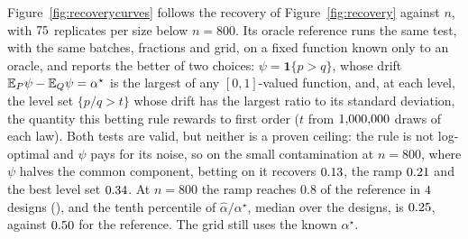 Figure~\ref{fig:recoverycurves} follows the recovery of Figure~\ref{fig:recovery} against $n$, with $75$
replicates per size below $n=800$. Its oracle reference runs the same test, with the same batches, fractions
and grid, on a fixed function known only to an oracle, and reports the better of two choices: $\psi=\mathbf 1\{p>q\}$,
whose drift $\mathbb{E}_P\psi-\mathbb{E}_Q\psi=\alpha^\star$ is the largest of any $[0,1]$-valued function, and, at each level, the
level set $\{p/q>t\}$ whose drift has the largest ratio to its standard deviation, the quantity this betting rule
rewards to first order ($t$ from $1{,}000{,}000$ draws of each law). Both tests are valid, but neither is a proven ceiling: the
rule is not log-optimal and $\psi$ pays for its noise, so on the small contamination at $n=800$, where $\psi$ halves the
common component, betting on it recovers $0.13$, the ramp $0.21$ and the best level set $0.34$. At
$n=800$ the ramp reaches $0.8$ of the reference in $4$ designs (\rcEightyDesignsEightHundred), and the
tenth percentile of $\widehat\alpha/\alpha^\star$, median over the designs, is $0.25$, against
$0.50$ for the reference. The grid still uses the known $\alpha^\star$.


